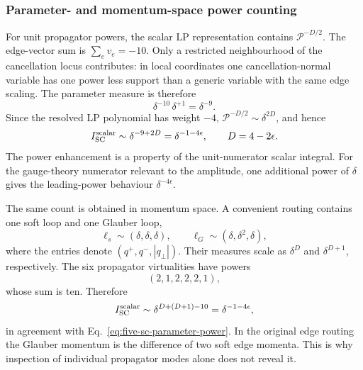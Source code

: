\documentclass[a4paper,11pt]{article}
\begin{document}
\subsubsection*{Parameter- and momentum-space power counting}

For unit propagator powers, the scalar LP representation contains
\(\mathcal P^{-D/2}\).  The edge-vector sum is
\(\sum_e v_e=-10\).  Only a restricted neighbourhood of the cancellation
locus contributes: in local coordinates one cancellation-normal variable
has one power less support than a generic variable with the same edge
scaling.  The parameter measure is therefore
\begin{equation}
 \delta^{-10}\,\delta^{+1}=\delta^{-9}.
 \label{eq:five-sc-parameter-measure}
\end{equation}
Since the resolved LP polynomial has weight \(-4\),
\(\mathcal P^{-D/2}\sim\delta^{2D}\), and hence
\begin{equation}
 I_{\rm SC}^{\rm scalar}\sim
 \delta^{-9+2D}=\delta^{-1-4\epsilon},
 \qquad D=4-2\epsilon.
 \label{eq:five-sc-parameter-power}
\end{equation}
The power enhancement is a property of the unit-numerator scalar integral.
For the gauge-theory numerator relevant to the amplitude, one additional
power of \(\delta\) gives the leading-power behaviour
\(\delta^{-4\epsilon}\).

The same count is obtained in momentum space.  A convenient routing contains
one soft loop and one Glauber loop,
\begin{equation}
 \ell_s\sim(\delta,\delta,\delta),
 \qquad
 \ell_G\sim(\delta,\delta^2,\delta),
 \label{eq:five-sc-modes}
\end{equation}
where the entries denote \((q^+,q^-,|q_\perp|)\).  Their measures scale as
\(\delta^D\) and \(\delta^{D+1}\), respectively.  The six propagator
virtualities have powers
\begin{equation}
 (2,1,2,2,2,1),
 \label{eq:five-sc-virtualities}
\end{equation}
whose sum is ten.  Therefore
\begin{equation}
 I_{\rm SC}^{\rm scalar}\sim
 \delta^{D+(D+1)-10}=\delta^{-1-4\epsilon},
 \label{eq:five-sc-momentum-power}
\end{equation}
in agreement with Eq.~\eqref{eq:five-sc-parameter-power}.  In the original
edge routing the Glauber momentum is the difference of two soft edge
momenta.  This is why inspection of individual propagator modes alone does
not reveal it.
\end{document}
